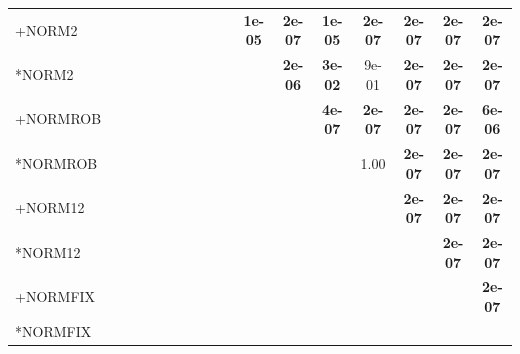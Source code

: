 \begin{table}[t]
{\begin{tabular}{lcccccccccccccccc}
+NORM2 &  &  &  &  &  &  &  &  &  & \textbf{1e-05} & \textbf{2e-07} & \textbf{1e-05} & \textbf{2e-07} & \textbf{2e-07} & \textbf{2e-07} & \textbf{2e-07} \\
*NORM2 &  &  &  &  &  &  &  &  &  &  & \textbf{2e-06} & \textbf{3e-02} & 9e-01 & \textbf{2e-07} & \textbf{2e-07} & \textbf{2e-07} \\
+NORMROB &  &  &  &  &  &  &  &  &  &  &  & \textbf{4e-07} & \textbf{2e-07} & \textbf{2e-07} & \textbf{2e-07} & \textbf{6e-06} \\
*NORMROB &  &  &  &  &  &  &  &  &  &  &  &  & 1.00 & \textbf{2e-07} & \textbf{2e-07} & \textbf{2e-07} \\
+NORM12 &  &  &  &  &  &  &  &  &  &  &  &  &  & \textbf{2e-07} & \textbf{2e-07} & \textbf{2e-07} \\
*NORM12 &  &  &  &  &  &  &  &  &  &  &  &  &  &  & \textbf{2e-07} & \textbf{2e-07} \\
+NORMFIX &  &  &  &  &  &  &  &  &  &  &  &  &  &  &  & \textbf{2e-07} \\
*NORMFIX &  &  &  &  &  &  &  &  &  &  &  &  &  &  &  &  \\
\bottomrule
\end{tabular}
}
\end{table}

